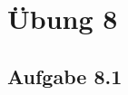 \documentclass{standalone}
\begin{document}
\section{Übung 8}
\subsection{Aufgabe 8.1}
\end{document}
